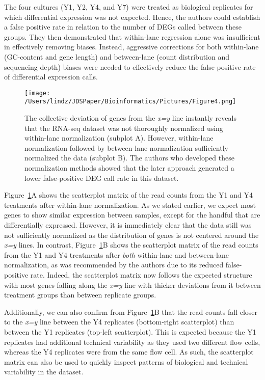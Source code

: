 \documentclass{bioinfo}
\begin{document}
The four cultures (Y1, Y2, Y4, and Y7) were treated as biological replicates for which differential expression was not expected. Hence, the authors could establish a false positive rate in relation to the number of DEGs called between these groups. They then demonstrated that within-lane regression alone was insufficient in effectively removing biases. Instead, aggressive corrections for both within-lane (GC-content and gene length) and between-lane (count distribution and sequencing depth) biases were needed to effectively reduce the false-positive rate of differential expression calls.

\begin{figure}[!tpb]
\centerline{\texttt{[image: /Users/lindz/JDSPaper/Bioinformatics/Pictures/Figure4.png]}}
\caption{The collective deviation of genes from the \textit{x=y} line instantly reveals that the RNA-seq dataset was not thoroughly normalized using within-lane normalization (subplot A). However, within-lane normalization followed by between-lane normalization sufficiently normalized the data (subplot B). The authors who developed these normalization methods showed that the later approach generated a lower false-positive DEG call rate in this dataset.
\label{withinbtwn}}
\end{figure}

Figure~\ref{withinbtwn}A shows the scatterplot matrix of the read counts from the Y1 and Y4 treatments after within-lane normalization. As we stated earlier, we expect most genes to show similar expression between samples, except for the handful that are differentially expressed. However, it is immediately clear that the data still was not sufficiently normalized as the distribution of genes is not centered around the \textit{x=y} lines. In contrast, Figure~\ref{withinbtwn}B shows the scatterplot matrix of the read counts from the Y1 and Y4 treatments after \textit{both} within-lane and between-lane normalization, as was recommended by the authors due to its reduced false-positive rate. Indeed, the scatterplot matrix now follows the expected structure with most genes falling along the \textit{x=y} line with thicker deviations from it between treatment groups than between replicate groups.

Additionally, we can also confirm from Figure~\ref{withinbtwn}B that the read counts fall closer to the \textit{x=y} line between the Y4 replicates (bottom-right scatterplot) than between the Y1 replicates (top-left scatterplot). This is expected because the Y1 replicates had additional technical variability as they used two different flow cells, whereas the Y4 replicates were from the same flow cell. As such, the scatterplot matrix can also be used to quickly inspect patterns of biological and technical variability in the dataset.
\end{document}
